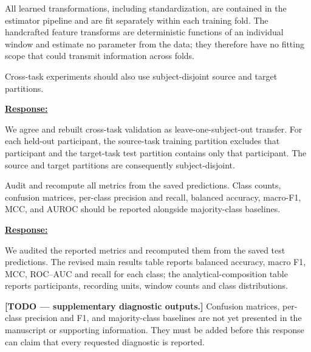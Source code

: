 \documentclass{article}
\begin{document}
All learned transformations, including standardization, are contained in the
estimator pipeline and are fit separately within each training fold. The
handcrafted feature transforms are deterministic functions of an individual
window and estimate no parameter from the data; they therefore have no fitting
scope that could transmit information across folds.

\vspace{0.3cm}


\begin{cmt}{}{}

Cross-task experiments should also use subject-disjoint source and target
partitions.

\end{cmt}
\vspace{0.1cm}
\noindent
\underline{\textbf{Response:}}
\vspace{0.2cm}

We agree and rebuilt cross-task validation as leave-one-subject-out transfer.
For each held-out participant, the source-task training partition excludes that
participant and the target-task test partition contains only that participant.
The source and target partitions are consequently subject-disjoint.

\vspace{0.3cm}


\begin{cmt}{}{}

Audit and recompute all metrics from the saved predictions. Class counts,
confusion matrices, per-class precision and recall, balanced accuracy, macro-F1,
MCC, and AUROC should be reported alongside majority-class baselines.

\end{cmt}
\vspace{0.1cm}
\noindent
\underline{\textbf{Response:}}
\vspace{0.2cm}

We audited the reported metrics and recomputed them from the saved test
predictions. The revised main results table reports balanced accuracy, macro F1,
MCC, ROC--AUC and recall for each class; the analytical-composition table reports
participants, recording units, window counts and class distributions.

\textbf{[TODO --- supplementary diagnostic outputs.]}
Confusion matrices, per-class precision and F1, and majority-class baselines are
not yet presented in the manuscript or supporting information. They must be
added before this response can claim that every requested diagnostic is reported.
\end{document}
